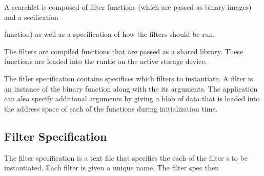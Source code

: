 A searchlet is composed of filter functions (which are passed as
binary images) and a secification

 function) as well as 
a specification of how the filters should be run.  

The filters are compiled functions that are passed as a shared library.
These functions are loaded into the runtie on the active storage
device.

The fitler specification contains  specifices which filters
to instantiate.  A filter is an instance of the binary function along
with the its arguments.  The application can also specify additional
arguments by giving a blob of data that is loaded into
the address space of each of the functions during initialization
time.


\subsection{Filter Specification}

The filter specification is a text file that specifies the each of the filter
s to be instantiated.  Each filter is given a unique name.  The filter
spec then 

